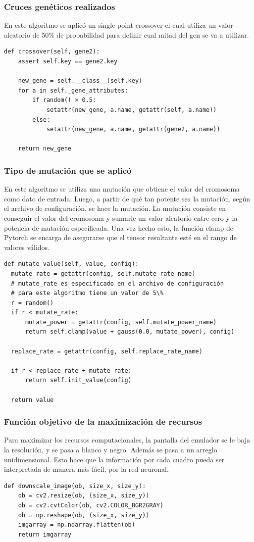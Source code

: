 \documentclass{article}
\begin{document}
\subsubsection{Cruces genéticos realizados}
En este algoritmo se aplicó un single point crossover el cual utiliza un valor aleatorio de 50\% de probabilidad para definir cual mitad del gen se va a utilizar.
\begin{verbatim}
def crossover(self, gene2):
    assert self.key == gene2.key

    new_gene = self.__class__(self.key)
    for a in self._gene_attributes:
        if random() > 0.5:
            setattr(new_gene, a.name, getattr(self, a.name))
        else:
            setattr(new_gene, a.name, getattr(gene2, a.name))

    return new_gene
\end{verbatim}
\textcite{neat-python}

\subsubsection{Tipo de mutación que se aplicó}
En este algoritmo se utiliza una mutación que obtiene el valor del cromosoma como dato de entrada. Luego, a partir de qué tan potente sea la mutación, según el archivo de configuración, se hace la mutación. La mutación consiste en conseguir el valor del cromosoma y sumarle un valor aleatorio entre cero y la potencia de mutación especificada. Una vez hecho esto, la función clamp de Pytorch se encarga de asegurarse que el tensor resultante esté en el rango de valores válidos.
\begin{verbatim}
def mutate_value(self, value, config):
  mutate_rate = getattr(config, self.mutate_rate_name)
  # mutate_rate es especificado en el archivo de configuración
  # para este algoritmo tiene un valor de 5\%
  r = random()
  if r < mutate_rate:
      mutate_power = getattr(config, self.mutate_power_name)
      return self.clamp(value + gauss(0.0, mutate_power), config)

  replace_rate = getattr(config, self.replace_rate_name)

  if r < replace_rate + mutate_rate:
      return self.init_value(config)

  return value
\end{verbatim}
\textcite{neat-python}

\subsubsection{Función objetivo de la maximización de recursos}
Para maximizar los recursos computacionales, la pantalla del emulador se le baja la resolución, y se pasa a blanco y negro. Además se pasa a un arreglo unidimensional. Esto hace que la información por cada cuadro pueda ser interpretada de manera más fácil, por la red neuronal.
\begin{verbatim}
def downscale_image(ob, size_x, size_y):
    ob = cv2.resize(ob, (size_x, size_y))
    ob = cv2.cvtColor(ob, cv2.COLOR_BGR2GRAY)
    ob = np.reshape(ob, (size_x, size_y))
    imgarray = np.ndarray.flatten(ob)
    return imgarray
\end{verbatim}
\end{document}
